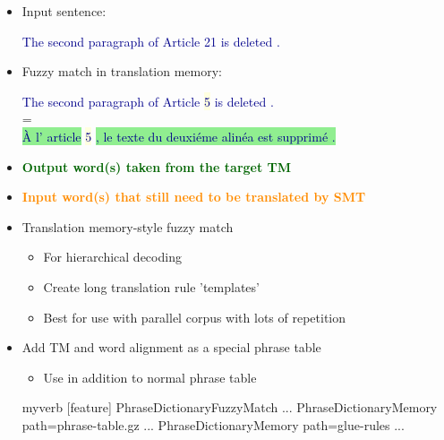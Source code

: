 \documentclass[landscape]{uedslides2C}
\newcommand{\example}[1]{\textcolor{darkblue}{\rm #1}}
\newcommand{\highlight}[1]{\colorbox{lightyellow}{#1}}
\newcommand{\highlightOrange}[1]{\colorbox{lightorange}{#1}}
\newcommand{\highlightGreen}[1]{\colorbox{lightgreen}{#1}}
\begin{document}

\begin{itemize}
\item Input sentence: \vspace{-5mm}
\begin{center}
\example{The second paragraph of Article \highlightOrange{21} is deleted .}
\end{center}
\item Fuzzy match in translation memory: \vspace{-5mm}
\begin{center}
\example{The second paragraph of Article \highlight{5} is deleted .}\\
=\\
\example{\highlightGreen{{\`A} l' article} \highlight{5} \highlightGreen{, le texte du deuxi{\'e}me alin{\'e}a est supprim{\'e} .}}
\end{center}
\item[] \textcolor{darkgreen}{\bf Output word(s) taken from the target TM}  \vspace{-5mm}
\item[] \textcolor{darkorange}{\bf Input word(s) that still need to be translated by SMT}
\end{itemize}



\begin{itemize} \itemsep -1mm
\item Translation memory-style fuzzy match
  \begin{itemize}
  \item For hierarchical decoding
  \item Create long translation rule 'templates'
  \item Best for use with parallel corpus with lots of repetition
  \end{itemize}

\item Add TM and word alignment as a special phrase table
  \begin{itemize}
    \item Use in addition to normal phrase table
  \end{itemize}
  \begin{SaveVerbatim}{myverb} 
   [feature]
   PhraseDictionaryFuzzyMatch ...
   PhraseDictionaryMemory path=phrase-table.gz ...
   PhraseDictionaryMemory path=glue-rules ...
  \end{SaveVerbatim}
  \colorbox{gray}{}

\end{itemize}
\end{document}

